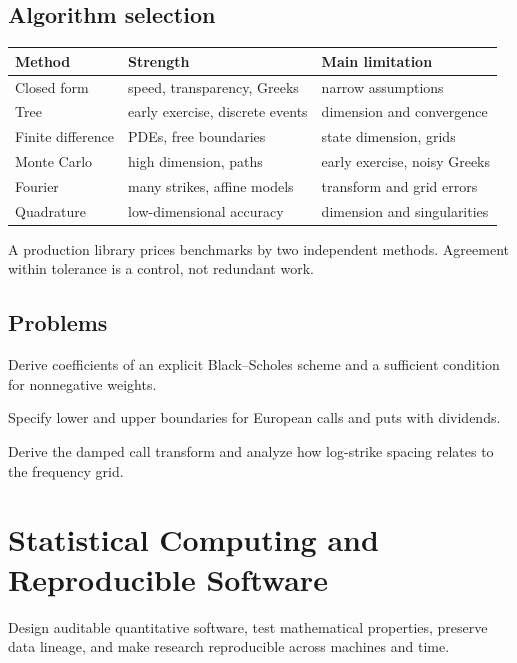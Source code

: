 \section{Algorithm selection}

\begin{longtable}{p{}p{}p{}}
\toprule
Method & Strength & Main limitation\\
\midrule
Closed form & speed, transparency, Greeks & narrow assumptions\\
Tree & early exercise, discrete events & dimension and convergence\\
Finite difference & PDEs, free boundaries & state dimension, grids\\
Monte Carlo & high dimension, paths & early exercise, noisy Greeks\\
Fourier & many strikes, affine models & transform and grid errors\\
Quadrature & low-dimensional accuracy & dimension and singularities\\
\bottomrule
\end{longtable}

A production library prices benchmarks by two independent methods. Agreement within
tolerance is a control, not redundant work.

\section{Problems}

\begin{exercise}
Derive coefficients of an explicit Black--Scholes scheme and a sufficient condition
for nonnegative weights.
\end{exercise}
\begin{exercise}
Specify lower and upper boundaries for European calls and puts with dividends.
\end{exercise}
\begin{exercise}
Derive the damped call transform and analyze how log-strike spacing relates to the
frequency grid.
\end{exercise}


\chapter{Statistical Computing and Reproducible Software}

\begin{objectives}
Design auditable quantitative software, test mathematical properties, preserve data
lineage, and make research reproducible across machines and time.
\end{objectives}

